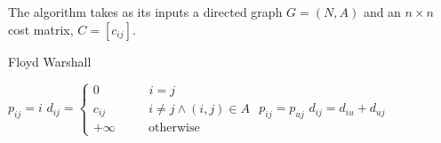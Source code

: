 The algorithm takes as its inputs a directed graph $G = (N,A)$ and an $n \times n$ cost matrix, $C = [c_{ij}]$.
\begin{algorithm}[H]
    \caption{Floyd Warshall}
        \begin{algorithmic}[1]
                    \State $p_{ij} = i$
                    \State $d_{ij} = \begin{cases}
                        0 \qquad\qquad i = j \\
                        c_{ij} \qquad\quad\:\: i \neq j \land (i,j) \in A \\
                        +\infty \qquad\:\:\: \text{otherwise}
                    \end{cases}$
                \EndFor
            \EndFor
                            \State $p_{ij} = p_{uj}$
                            \State $d_{ij} = d_{iu}+d_{uj}$
                        \EndIf
                    \EndFor
                \EndFor
                        \State \Return
                    \EndIf
                \EndFor
            \EndFor
        \end{algorithmic}
\end{algorithm}


